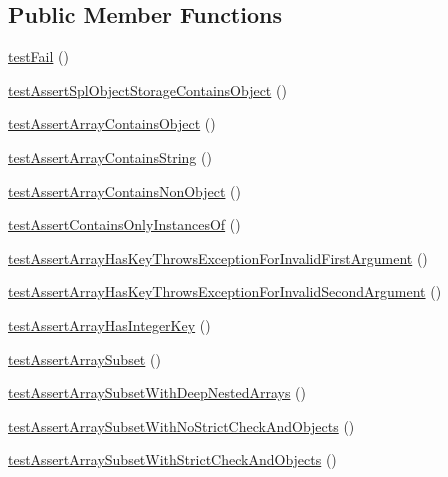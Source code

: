 \subsection*{Public Member Functions}
\begin{DoxyCompactItemize}
\item 
\mbox{\hyperlink{class_framework___assert_test_a5646821af3c3d8899e68016b97ecca60}{test\+Fail}} ()
\item 
\mbox{\hyperlink{class_framework___assert_test_ab46942f44b556554abf3105fce328730}{test\+Assert\+Spl\+Object\+Storage\+Contains\+Object}} ()
\item 
\mbox{\hyperlink{class_framework___assert_test_a0c854d5bddcd500f1cf9b3de72cf43c8}{test\+Assert\+Array\+Contains\+Object}} ()
\item 
\mbox{\hyperlink{class_framework___assert_test_a876605395172ce1a302f89234936ecf0}{test\+Assert\+Array\+Contains\+String}} ()
\item 
\mbox{\hyperlink{class_framework___assert_test_adeff05f81bd5623538ff6e0ce7d09357}{test\+Assert\+Array\+Contains\+Non\+Object}} ()
\item 
\mbox{\hyperlink{class_framework___assert_test_adc6efea6bd3f4548a8bd0b5ccd3cb655}{test\+Assert\+Contains\+Only\+Instances\+Of}} ()
\item 
\mbox{\hyperlink{class_framework___assert_test_ac022f0b1b4e4954e990b4cb379d6a36c}{test\+Assert\+Array\+Has\+Key\+Throws\+Exception\+For\+Invalid\+First\+Argument}} ()
\item 
\mbox{\hyperlink{class_framework___assert_test_a421cfe3899078a5c6f77e950e6b7792e}{test\+Assert\+Array\+Has\+Key\+Throws\+Exception\+For\+Invalid\+Second\+Argument}} ()
\item 
\mbox{\hyperlink{class_framework___assert_test_adc660bf451810ab2da5a6d931a96d5df}{test\+Assert\+Array\+Has\+Integer\+Key}} ()
\item 
\mbox{\hyperlink{class_framework___assert_test_a233e4d543c6c965fc9da56edae9c4224}{test\+Assert\+Array\+Subset}} ()
\item 
\mbox{\hyperlink{class_framework___assert_test_ac9961440df6266432a0e2398bd2c27df}{test\+Assert\+Array\+Subset\+With\+Deep\+Nested\+Arrays}} ()
\item 
\mbox{\hyperlink{class_framework___assert_test_a848bb4907f252dd6cac6a40dd497da36}{test\+Assert\+Array\+Subset\+With\+No\+Strict\+Check\+And\+Objects}} ()
\item 
\mbox{\hyperlink{class_framework___assert_test_a141cb7739b21723dd03d07b0cdca4172}{test\+Assert\+Array\+Subset\+With\+Strict\+Check\+And\+Objects}} ()

\end{DoxyCompactItemize}
